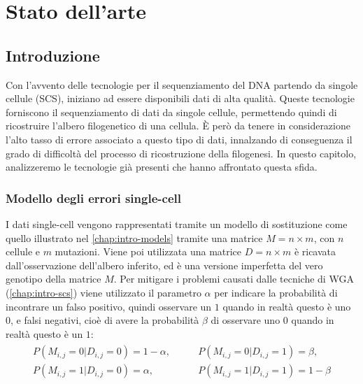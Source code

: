 
\chapter{Stato dell'arte}
\label{chap:art}


\section{Introduzione}
\label{chap:art-intro}
Con l'avvento delle tecnologie per il sequenziamento del DNA partendo da singole cellule (SCS), iniziano ad essere disponibili dati di alta qualità. Queste tecnologie forniscono il sequenziamento di dati da singole cellule, permettendo quindi di ricostruire l'albero filogenetico di una cellula. È però da tenere in considerazione l'alto tasso di errore associato a questo tipo di dati, innalzando di conseguenza il grado di difficoltà del processo di ricostruzione della filogenesi. 
In questo capitolo, analizzeremo le tecnologie già presenti che hanno affrontato questa sfida.

\subsection{Modello degli errori single-cell}
\label{chap:art-intro-model-matrix}
I dati single-cell vengono rappresentati tramite un modello di sostituzione come quello illustrato nel \autoref{chap:intro-models} tramite una matrice $M = n \times m$, con $n$ cellule e $m$ mutazioni. Viene poi utilizzata una matrice $D = n \times m$ è ricavata dall'osservazione dell'albero inferito, ed è una versione imperfetta del vero genotipo della matrice $M$. Per mitigare i problemi causati dalle tecniche di WGA (\autoref{chap:intro-scs}) viene utilizzato il parametro $\alpha$ per indicare la probabilità di incontrare un falso positivo, quindi osservare un $1$ quando in realtà questo è uno $0$, e falsi negativi, cioè di avere la probabilità $\beta$ di osservare uno $0$ quando in realtà questo è un $1$:
\begin{align}
    \label{eq:art-intro-model-matrix}
    \begin{split}
      P(M_{i,j} = 0 | D_{i,j} = 0) = 1 - \alpha, \qquad
      &P(M_{i,j} = 0 | D_{i,j} = 1) = \beta, \\
      P(M_{i,j} = 1 | D_{i,j} = 0) = \alpha, \qquad
      &P(M_{i,j} = 1 | D_{i,j} = 1) = 1 - \beta
    \end{split}
\end{align}


